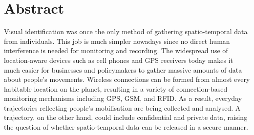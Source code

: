 \section*{Abstract}
Visual identification was once the only method of gathering spatio-temporal data
from individuals. This job is much simpler nowadays since no direct human
interference is needed for monitoring and recording. The widespread use of
location-aware devices such as cell phones and GPS receivers today makes it much
easier for businesses and policymakers to gather massive amounts of data about
people's movements. Wireless connections can be formed from almost every
habitable location on the planet, resulting in a variety of connection-based
monitoring mechanisms including GPS, GSM, and RFID. As a result, everyday
trajectories reflecting people's mobilisation are being collected and analysed. A
trajectory, on the other hand, could include confidential and private data, raising the
question of whether spatio-temporal data can be released in a secure manner.